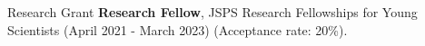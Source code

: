 \begin{rSection}{Research Grant}
{\bf Research Fellow}, JSPS Research Fellowships for Young Scientists (April 2021 - March 2023) (Acceptance rate: 20\%).
\end{rSection}